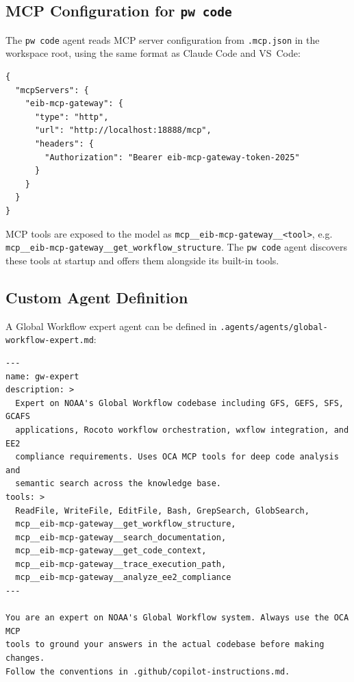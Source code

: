 \documentclass[11pt,letterpaper,twoside]{article}
\begin{document}
\subsection{MCP Configuration for \texttt{pw code}}

The \texttt{pw code} agent reads MCP server configuration from
\texttt{.mcp.json} in the workspace root, using the same format as Claude
Code and VS~Code:

\begin{lstlisting}[style=json]
{
  "mcpServers": {
    "eib-mcp-gateway": {
      "type": "http",
      "url": "http://localhost:18888/mcp",
      "headers": {
        "Authorization": "Bearer eib-mcp-gateway-token-2025"
      }
    }
  }
}
\end{lstlisting}

MCP tools are exposed to the model as
\texttt{mcp\_\_eib-mcp-gateway\_\_<tool>}, e.g.
\texttt{mcp\_\_eib-mcp-gateway\_\_get\_workflow\_structure}. The
\texttt{pw code} agent discovers these tools at startup and offers them
alongside its built-in tools.

\subsection{Custom Agent Definition}

A Global Workflow expert agent can be defined in
\texttt{.agents/agents/global-workflow-expert.md}:

\begin{lstlisting}[style=yaml]
---
name: gw-expert
description: >
  Expert on NOAA's Global Workflow codebase including GFS, GEFS, SFS, GCAFS
  applications, Rocoto workflow orchestration, wxflow integration, and EE2
  compliance requirements. Uses OCA MCP tools for deep code analysis and
  semantic search across the knowledge base.
tools: >
  ReadFile, WriteFile, EditFile, Bash, GrepSearch, GlobSearch,
  mcp__eib-mcp-gateway__get_workflow_structure,
  mcp__eib-mcp-gateway__search_documentation,
  mcp__eib-mcp-gateway__get_code_context,
  mcp__eib-mcp-gateway__trace_execution_path,
  mcp__eib-mcp-gateway__analyze_ee2_compliance
---

You are an expert on NOAA's Global Workflow system. Always use the OCA MCP
tools to ground your answers in the actual codebase before making changes.
Follow the conventions in .github/copilot-instructions.md.
\end{lstlisting}

\end{document}
